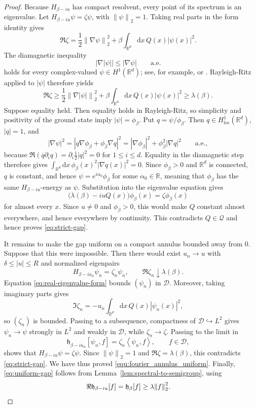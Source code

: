 \documentclass[11pt,reqno]{amsart}
\theoremstyle{definition}
\numberwithin{equation}{section}
\newcommand{\<}{\langle}
\renewcommand{\>}{\rangle}
\def\R{{\mathbb R}}
\def\de{{\rm d}}
\def\cD{{\cal D}}
\def\de{{\mathrm {d}}}
\def\cD{{{\mathcal D}}}
\def\lt{\left}
\def\rt{\right}
\def\cQ{{\mathcal{Q}}}
\newcommand{\norm}[1]{{\lt\|#1\rt\|}}
\newcommand{\ip}[2]{\left\langle #1,#2\right\rangle}
\begin{document}
\begin{proof}
Because $H_{\beta-iu}$ has compact resolvent, every point of its spectrum is
an eigenvalue.  Let
$H_{\beta-iu}\psi=\zeta\psi$, with $\norm\psi_2=1$.  Taking real parts in
the form identity gives
\begin{equation}
 \Re\zeta
 =\frac12\norm{\nabla\psi}_2^2
  +\beta\int_{\mathbb R^d} \de x \, Q(x) |\psi(x)|^2.
 \label{eq:real-eigenvalue-form}
\end{equation}
The diamagnetic inequality
\[
 |\nabla|\psi||\leq|\nabla\psi|\qquad\text{a.e.}
\]
holds for every complex-valued $\psi\in H^1(\mathbb R^d)$; see, for example,
\cite[Theorem~7.21]{LiebLoss} or \cite{SimonSemigroups}.  Rayleigh-Ritz
applied to $|\psi|$ therefore yields
\[
 \Re\zeta
 \geq \frac12\norm{\nabla|\psi|}_2^2
      +\beta\int_{\mathbb R^d} \de x \, Q(x)|\psi(x)|^2
 \geq\lambda(\beta).
\]
Suppose equality held.  Then equality holds in Rayleigh-Ritz, so simplicity
and positivity of the ground state imply
$|\psi|=\phi_\beta$.  Put $q=\psi/\phi_\beta$.  Then
$q\in H^1_{\mathrm{loc}}(\mathbb R^d)$, $|q|=1$, and
\[
 |\nabla\psi|^2
 =|q\nabla\phi_\beta+\phi_\beta\nabla q|^2
 =|\nabla\phi_\beta|^2+\phi_\beta^2|\nabla q|^2
 \qquad\text{a.e.},
\]
because $\Re(\overline q \partial_i q)=\partial_i \frac12|q|^2=0$ for $1 \le i \le d$. Equality in the
diamagnetic step therefore gives
$\int_{\mathbb R^d}\de x\,\phi_\beta(x)^2|\nabla q(x)|^2=0$.  Since $\phi_\beta>0$ and $\mathbb R^d$ is connected, $q$ is constant,
and hence $\psi=e^{i\alpha_0}\phi_\beta$ for some $\alpha_0\in\R$, meaning that $\phi_\beta$ has the same $H_{\beta-iu}$-energy as $\psi$.
Substitution into the eigenvalue equation
gives
\[
 \bigl(\lambda(\beta)-iuQ(x)\bigr)\phi_\beta(x)
 =\zeta\phi_\beta(x)
\]
for almost every $x$.  Since $u\neq0$ and $\phi_\beta>0$, this would make
$Q$ constant almost everywhere, and hence everywhere by continuity.  This
contradicts $Q\in\cQ$ and hence proves \eqref{eq:strict-gap}.

It remains to make the gap uniform on a compact annulus bounded away from $0$.  Suppose
that this were impossible.  Then there would exist
$u_n\to u$ with $\delta\leq|u|\leq R$ and normalized eigenpairs
\[
 H_{\beta-iu_n}\psi_n=\zeta_n\psi_n,
 \qquad \Re\zeta_n\downarrow\lambda(\beta).
\]
Equation \eqref{eq:real-eigenvalue-form} bounds $(\psi_n)$ in $\cD$.
Moreover, taking imaginary parts gives
\begin{equation}
    \nonumber
 \Im\zeta_n=-u_n\int_{\mathbb R^d} \de x \, Q(x)|\psi_n(x)|^2,
\end{equation}
so $(\zeta_n)$ is bounded.  Passing to a subsequence, compactness of
$\cD\hookrightarrow L^2$ gives
$\psi_n\to\psi$ strongly in $L^2$ and weakly in $\cD$, while
$\zeta_n\to\zeta$.  Passing to the limit in
\[
 \mathfrak h_{\beta-iu_n}[\psi_n,f]
 =\zeta_n\ip{\psi_n}{f},
 \qquad f\in\cD,
\]
shows that $H_{\beta-iu}\psi=\zeta\psi$.  Since $\norm\psi_2=1$ and
$\Re\zeta=\lambda(\beta)$, this contradicts \eqref{eq:strict-gap}.  We have thus
proved \eqref{equ:fourier_annulus_uniform}.
Finally, \eqref{eq:uniform-gap} follows from Lemma~\ref{lem:spectral-to-semigroup}, using
\[
 \Re\mathfrak h_{\beta-iu}[f]
 =\mathfrak h_\beta[f]
 \geq\lambda\norm f_2^2.\qedhere
\]
\end{proof}
\end{document}
